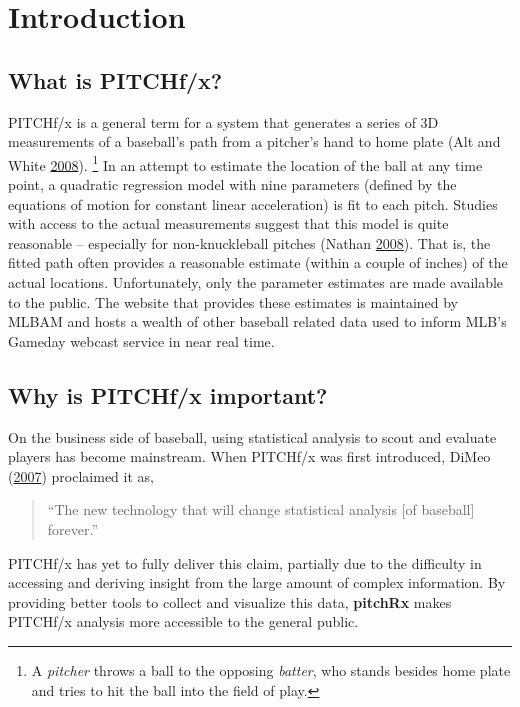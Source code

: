 \documentclass[12pt,]{isuthesis}
\let\rmarkdownfootnote\footnote%
\def\footnote{\protect\rmarkdownfootnote}
\begin{document}
\section{Introduction}\label{introduction}

\subsection{What is PITCHf/x?}\label{what-is-pitchfx}

PITCHf/x is a general term for a system that generates a series of 3D
measurements of a baseball's path from a pitcher's hand to home plate
(Alt and White \protect\hyperlink{ref-patent}{2008}).
\footnote{A \textit{pitcher} throws a ball to the opposing \textit{batter}, who
stands besides home plate and tries to hit the ball into the field
of play.
} In an attempt to estimate the location of the ball at any time point,
a quadratic regression model with nine parameters (defined by the
equations of motion for constant linear acceleration) is fit to each
pitch. Studies with access to the actual measurements suggest that this
model is quite reasonable -- especially for non-knuckleball pitches
(Nathan \protect\hyperlink{ref-trajecoryAnalysis}{2008}). That is, the
fitted path often provides a reasonable estimate (within a couple of
inches) of the actual locations. Unfortunately, only the parameter
estimates are made available to the public. The website that provides
these estimates is maintained by MLBAM and hosts a wealth of other
baseball related data used to inform MLB's Gameday webcast service in
near real time.

\subsection{Why is PITCHf/x important?}\label{why-is-pitchfx-important}

On the business side of baseball, using statistical analysis to scout
and evaluate players has become mainstream. When PITCHf/x was first
introduced, DiMeo (\protect\hyperlink{ref-slate}{2007}) proclaimed it
as,

\begin{quote} ``The new technology that will change statistical analysis [of baseball] forever.'' \end{quote}

PITCHf/x has yet to fully deliver this claim, partially due to the
difficulty in accessing and deriving insight from the large amount of
complex information. By providing better tools to collect and visualize
this data, \textbf{pitchRx} makes PITCHf/x analysis more accessible to
the general public.
\end{document}
